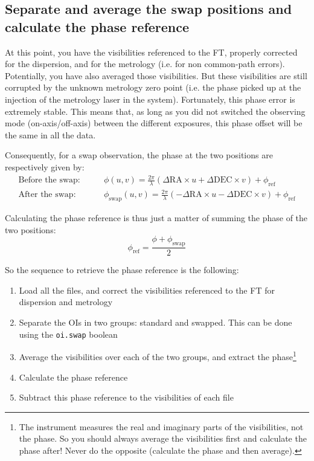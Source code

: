 \subsection{Separate and average the swap positions and calculate the phase reference}

At this point, you have the visibilities referenced to the FT, properly corrected for the dispersion, and for the metrology (i.e. for non common-path errors). Potentially, you have also averaged those visibilities. But these visibilities are still corrupted by the unknown metrology zero point (i.e. the phase picked up at the injection of the metrology laser in the system). Fortunately, this phase error is extremely stable. This means that, as long as you did not switched the observing mode (on-axis/off-axis) between the different exposures, this phase offset will be the same in all the data.

\noindent{}Consequently, for a swap observation, the phase at the two positions are respectively given by:
\begin{align*}
\text{Before the swap:} \qquad & \phi(u, v) = \frac{2\pi}{\lambda}\left(\Delta\mathrm{RA}\times{}u+\Delta\mathrm{DEC}\times{}v\right) + \phi_\mathrm{ref} \\
\text{After the swap:}  \qquad & \phi_\mathrm{swap}(u, v) = \frac{2\pi}{\lambda}\left(-\Delta\mathrm{RA}\times{}u-\Delta\mathrm{DEC}\times{}v\right) + \phi_\mathrm{ref}  
\end{align*}

\noindent{}Calculating the phase reference is thus just a matter of summing the phase of the two positions:
\begin{equation*}
  \phi_\mathrm{ref} = \frac{\phi + \phi_\mathrm{swap}}{2}
\end{equation*}

\noindent{}So the sequence to retrieve the phase reference is the following:
\begin{enumerate}
\item{Load all the files, and correct the visibilities referenced to the FT for dispersion and metrology}
\item{Separate the OIs in two groups: standard and swapped. This can be done using the \verb|oi.swap| boolean}
\item{Average the visibilities over each of the two groups, and extract the phase\footnote{The instrument measures the real and imaginary parts of the visibilities, not the phase. So you should always average the visibilities first and calculate the phase after! Never do the opposite (calculate the phase and then average).}}
\item{Calculate the phase reference}
\item{Subtract this phase reference to the visibilities of each file} 
\end{enumerate}
  
